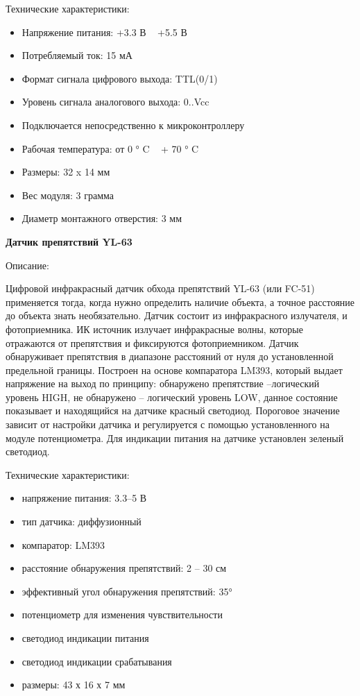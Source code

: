 Технические характеристики:
\begin{itemize}
    \itemsep0em
    \item Напряжение питания: +3.3 В ~ +5.5 В
    \item Потребляемый ток: 15 мА
    \item Формат сигнала цифрового выхода: TTL(0/1)
    \item Уровень сигнала аналогового выхода: 0..Vcc
    \item Подключается непосредственно к микроконтроллеру
    \item Рабочая температура: от 0 ° C ~ + 70 ° C
    \item Размеры: 32 x 14 мм
    \item Вес модуля: 3 грамма
    \item Диаметр монтажного отверстия: 3 мм
\end{itemize}


\textbf{Датчик препятствий YL-63}

Описание:

Цифровой инфракрасный датчик обхода препятствий YL-63 (или FC-51) применяется тогда, когда нужно определить наличие объекта, а точное расстояние до объекта знать необязательно.
Датчик состоит из инфракрасного излучателя, и фотоприемника.
ИК источник излучает инфракрасные волны, которые отражаются от препятствия и фиксируются фотоприемником.
Датчик обнаруживает препятствия в диапазоне расстояний от нуля до установленной предельной границы.
Построен на основе компаратора LM393, который выдает напряжение на выход по принципу: обнаружено препятствие –логический уровень HIGH, не обнаружено – логический уровень LOW, данное состояние показывает и находящийся на датчике красный светодиод.
Пороговое значение зависит от настройки датчика и регулируется с помощью установленного на модуле потенциометра.
Для индикации питания на датчике установлен зеленый светодиод.

Технические характеристики:
\begin{itemize}
    \itemsep0em
    \item напряжение питания: 3.3–5 В
    \item тип датчика: диффузионный
    \item компаратор: LM393
    \item расстояние обнаружения препятствий: 2 – 30 см
    \item эффективный угол обнаружения препятствий: 35°
    \item потенциометр для изменения чувствительности
    \item светодиод индикации питания
    \item светодиод индикации срабатывания
    \item размеры: 43 х 16 х 7 мм
\end{itemize}

